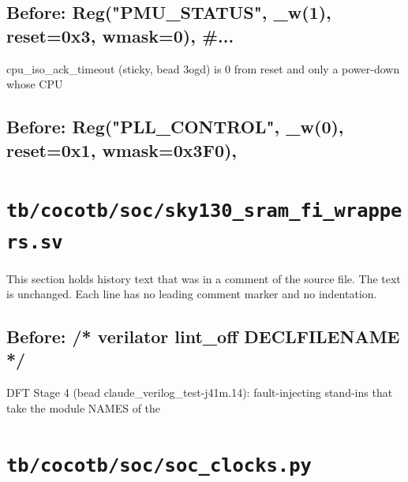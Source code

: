 \begin{record}

\subsection*{Before: Reg("PMU\_STATUS", \_w(1), reset=0x3, wmask=0),          \#...}

\begin{textblock}
[3] cpu_iso_ack_timeout (sticky, bead 3ogd) is 0 from reset and only a power-down whose CPU
\end{textblock}

\subsection*{Before: Reg("PLL\_CONTROL", \_w(0), reset=0x1, wmask=0x3F0),}


\end{record}

\section{\texttt{tb/cocotb/soc/sky130\_sram\_fi\_wrappers.sv}}\label{cr:suite:soc-sky130-sram-fi-wrappers-sv}

This section holds history text that was in a comment of the source file. The text is unchanged. Each line has no leading comment marker and no indentation.

\begin{record}

\subsection*{Before: /* verilator lint\_off DECLFILENAME */}

\begin{textblock}
DFT Stage 4 (bead claude_verilog_test-j41m.14): fault-injecting stand-ins that take the module NAMES of the
\end{textblock}

\end{record}

\section{\texttt{tb/cocotb/soc/soc\_clocks.py}}\label{cr:suite:soc-soc-clocks}

